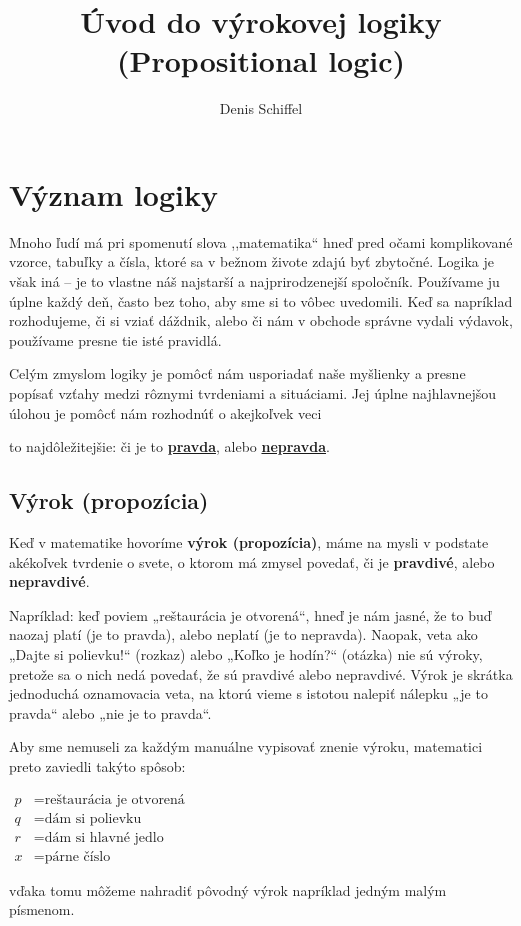 \documentclass{article}
\title{\textbf{Úvod do výrokovej logiky}\\ \large (Propositional logic)}
\author{Denis Schiffel}
\date{}
\begin{document}
\maketitle
\section{Význam logiky}

Mnoho ľudí má pri spomenutí slova ,,matematika“ hneď pred očami komplikované vzorce, tabuľky a čísla, ktoré sa v bežnom živote zdajú byť zbytočné. Logika je však iná – je to vlastne náš najstarší a najprirodzenejší spoločník. Používame ju úplne každý deň, často bez toho, aby sme si to vôbec uvedomili. Keď sa napríklad rozhodujeme, či si vziať dáždnik, alebo či nám v obchode správne vydali výdavok, používame presne tie isté pravidlá.

Celým zmyslom logiky je pomôcť nám usporiadať naše myšlienky a presne popísať vzťahy medzi rôznymi tvrdeniami a situáciami. Jej úplne najhlavnejšou úlohou je pomôcť nám rozhodnúť o akejkoľvek veci 

to najdôležitejšie: či je to \underline{\textbf{pravda}}, alebo \underline{\textbf{nepravda}}.
\subsection{Výrok (propozícia)}
Keď v matematike hovoríme \textbf{výrok (propozícia)}, máme na mysli v podstate akékoľvek tvrdenie o svete, o ktorom má zmysel povedať, či je \textbf{pravdivé}, alebo \textbf{nepravdivé}.

Napríklad: keď poviem „reštaurácia je otvorená“, hneď je nám jasné, že to buď naozaj platí (je to pravda), alebo neplatí (je to nepravda). Naopak, veta ako „Dajte si polievku!“ (rozkaz) alebo „Koľko je hodín?“ (otázka) nie sú výroky, pretože sa o nich nedá povedať, že sú pravdivé alebo nepravdivé. Výrok je skrátka jednoduchá oznamovacia veta, na ktorú vieme s istotou nalepiť nálepku „je to pravda“ alebo „nie je to pravda“.\bigskip \bigskip

Aby sme nemuseli za každým manuálne vypisovať znenie výroku, matematici preto zaviedli takýto spôsob: 
\begin{center}
\vspace{5mm}
$\begin{aligned}
p &= \text{reštaurácia je otvorená} \\
q &= \text{dám si polievku} \\
r &= \text{dám si hlavné jedlo} \\
x &= \text{párne číslo}
\end{aligned}$
\end{center} 
\bigskip \bigskip \hspace{5mm} vďaka tomu môžeme nahradiť pôvodný výrok napríklad jedným malým písmenom.
\vspace{5mm}
\end{document}
